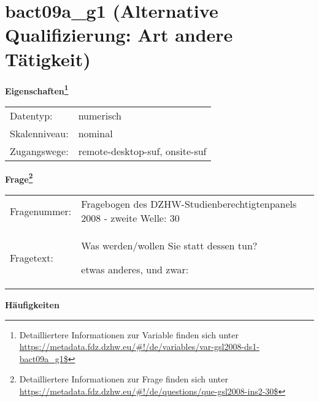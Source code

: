 
    \setcounter{footnote}{0}

    \vspace*{-1.8cm}
	\section{bact09a\_g1 (Alternative Qualifizierung: Art andere Tätigkeit)}
	\label{section:bact09a_g1}



    \vspace*{0.5cm}
    \noindent\textbf{Eigenschaften\footnote{Detailliertere Informationen zur Variable finden sich unter
		\url{https://metadata.fdz.dzhw.eu/\#!/de/variables/var-gsl2008-ds1-bact09a_g1$}}}\\
	\begin{tabularx}{\hsize}{@{}lX}
	Datentyp: & numerisch \\
	Skalenniveau: & nominal \\
	Zugangswege: &
	  remote-desktop-suf, 
	  onsite-suf
 \\
    \end{tabularx}



				\vspace*{0.5cm}
                \noindent\textbf{Frage\footnote{Detailliertere Informationen zur Frage finden sich unter
		              \url{https://metadata.fdz.dzhw.eu/\#!/de/questions/que-gsl2008-ins2-30$}}}\\
				\begin{tabularx}{\hsize}{@{}lX}
					Fragenummer: &
					  Fragebogen des DZHW-Studienberechtigtenpanels 2008 - zweite Welle:
					  30
 \\
					Fragetext: & Was werden/wollen Sie statt dessen tun?\par  etwas anderes, und zwar: \\
				\end{tabularx}





        		\vspace*{0.5cm}
                \noindent\textbf{Häufigkeiten}

